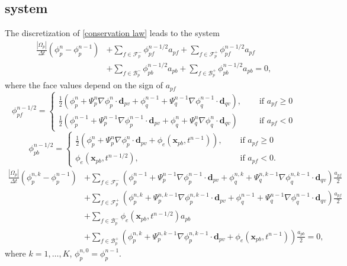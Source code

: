 \documentclass{article}
\begin{document}
\subsection{system}
The discretization of \eqref{conservation law} leads to the system
\begin{align}
	\nonumber
	\frac{|\Omega_p|}{\Delta t}(\phi_p^{n} - \phi_p^{n-1}) &+ \sum_{f \in \mathcal{F}_p^-} \phi_{pf}^{n-1/2} a_{pf} + \sum_{f \in \mathcal{F}_p^+} \phi_{pf}^{n-1/2} a_{pf}\\ 
	&+ \sum_{f \in \mathcal{B}_p^-} \phi_{pb}^{n-1/2} a_{pb} + \sum_{f \in \mathcal{B}_p^+} \phi_{pb}^{n-1/2} a_{pb} = 0,
\end{align}
where the face values depend on the sign of $ a_{pf} $
\[ \phi_{pf}^{n-1/2} =
\begin{cases}
	\frac{1}{2}(\phi_p^{n} + \Psi_p^{n}\nabla\phi_p^{n}\cdot\boldsymbol{d}_{pv}
	+
	\phi_q^{n-1} + \Psi_q^{n-1}\nabla\phi_q^{n-1}\cdot\boldsymbol{d}_{qv}), \quad &\text{ if } a_{pf} \geq 0 \\
	\frac{1}{2}(\phi_p^{n-1} + \Psi_p^{n-1}\nabla\phi_p^{n-1}\cdot\boldsymbol{d}_{pv}
	+
	\phi_q^{n} + \Psi_q^{n}\nabla\phi_q^{n}\cdot\boldsymbol{d}_{qv}) \quad &\text{ if } a_{pf} < 0
\end{cases} \]
\[ \phi_{pb}^{n-1/2} =
\begin{cases}
	\frac{1}{2}(\phi_p^{n} + \Psi_p^{n}\nabla\phi_p^{n}\cdot\boldsymbol{d}_{pv}
	+
	\phi_e(\boldsymbol{x}_{pb}, t^{n-1})), \quad &\text{ if } a_{pf} \geq 0 \\
	\phi_e(\boldsymbol{x}_{pb}, t^{n-1/2}),\quad &\text{ if } a_{pf} < 0.
\end{cases} \]
\begin{align}
	\nonumber
	\frac{|\Omega_p|}{\Delta t}(\phi_p^{n,k} - \phi_p^{n-1}) 
	&+ \sum_{f \in \mathcal{F}_p^-}(\phi_p^{n-1} + \Psi_p^{n-1}\nabla\phi_p^{n-1}\cdot\boldsymbol{d}_{pv}
	+
	\phi_q^{n,k} + \Psi_q^{n,k-1}\nabla\phi_q^{n,k-1}\cdot\boldsymbol{d}_{qv}) \frac{a_{pf}}{2} \nonumber\\ 
	&+ \sum_{f \in \mathcal{F}_p^+} (\phi_p^{n,k} + \Psi_p^{n,k-1}\nabla\phi_p^{n,k-1}\cdot\boldsymbol{d}_{pv}
	+
	\phi_q^{n-1} + \Psi_q^{n-1}\nabla\phi_q^{n-1}\cdot\boldsymbol{d}_{qv})\frac{a_{pf}}{2}\nonumber\\ 
	&+ \sum_{f \in \mathcal{B}_p^-} \phi_e(\boldsymbol{x}_{pb}, t^{n-1/2}) a_{pb}\nonumber \\
	&+ \sum_{f \in \mathcal{B}_p^+} (\phi_p^{n,k} + \Psi_p^{n,k-1}\nabla\phi_p^{n,k-1}\cdot\boldsymbol{d}_{pv}
	+
	\phi_e(\boldsymbol{x}_{pb}, t^{n-1})) \frac{a_{pb}}{2} = 0,
\end{align}
where $ k = 1,\dots, K $, $ \phi_p^{n, 0} = \phi_p^{n-1}. $
\end{document}
